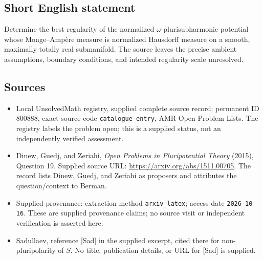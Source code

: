 \documentclass[11pt]{article}
\begin{document}
\subsection{Short English statement}
Determine the best regularity of the normalized \(\omega\)-plurisubharmonic potential whose Monge--Amp\`ere measure is normalized Hausdorff measure on a smooth, maximally totally real submanifold. The source leaves the precise ambient assumptions, boundary conditions, and intended regularity scale unresolved.
\subsection{Sources}
\begin{itemize}
\item Local UnsolvedMath registry, supplied complete source record: permanent ID \(800888\), exact source code \texttt{catalogue entry}, AMR Open Problem Lists. The registry labels the problem open; this is a supplied status, not an independently verified assessment.
\item Dinew, Guedj, and Zeriahi, \emph{Open Problems in Pluripotential Theory} (2015), Question 19. Supplied source URL: \url{https://arxiv.org/abs/1511.00705}. The record lists Dinew, Guedj, and Zeriahi as proposers and attributes the question/context to Berman.
\item Supplied provenance: extraction method \texttt{arxiv\_latex}; access date \texttt{2026-10-16}. These are supplied provenance claims; no source visit or independent verification is asserted here.
\item Sadullaev, reference [Sad] in the supplied excerpt, cited there for non-pluripolarity of \(S\). No title, publication details, or URL for [Sad] is supplied.
\end{itemize}
\end{document}

